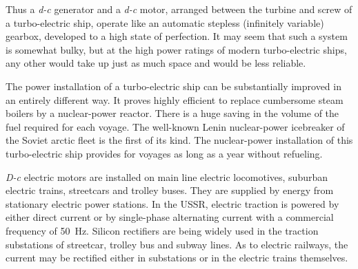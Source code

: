 Thus a \emph{d-c} generator and a \emph{d-c} motor, arranged between the turbine and screw of a turbo-electric ship, operate like an automatic stepless (infinitely variable) gearbox, developed to a high state of perfection. It may seem that such a system is somewhat bulky, but at the high power ratings of modern turbo-electric ships, any other would take up just as much space and would be less reliable.

The power installation of a turbo-electric ship can be substantially improved in an entirely different way. It proves highly efficient to replace cumbersome steam boilers by a nuclear-power reactor. There is a huge saving in the volume of the fuel required for each voyage. The well-known Lenin nuclear-power icebreaker of the Soviet arctic fleet is the first of its kind. The nuclear-power installation of this turbo-electric ship provides for voyages as long as a year without refueling.

\emph{D-c} electric motors are installed on main line electric locomotives, suburban electric trains, streetcars and trolley buses. They are supplied by energy from stationary electric power stations. In the USSR, electric traction is powered by either direct current or by single-phase alternating current with a commercial frequency of \SI{50}{\hertz}. Silicon rectifiers are being widely used in the traction substations of streetcar, trolley bus and subway lines. As to electric railways, the current may be rectified either in substations or in the electric trains themselves.











